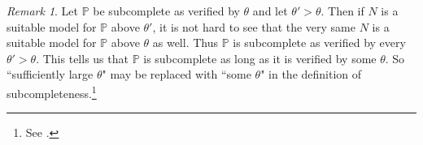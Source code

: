 \documentclass{amsart}
\theoremstyle{definition}
\newtheorem{definition}[theorem]{Definition}
\theoremstyle{remark}
\newtheorem{remark}[theorem]{Remark}
\renewcommand{\P}{\mathbb{P}}
\newcommand{\N}{{\overline{N}}}
\newcommand{\G}{\overline{G}}
\newcommand{\ZFC}{\textup{\ensuremath{\textsf{ZFC}}}}
\DeclareMathOperator{\ran}{range}
\newcommand{\SH}{\mathcal{H}\textit{ull} \,}
\newcommand{\sk}[3]{\SH^{#1}( {#2} \cup {\ran(#3)} ) }
\newcommand{\Sk}[3]{\SH^{#1}( {#2} \cup {#3} ) }
\begin{document}
%
%
%

\begin{remark}\label{remark:VerifyingSC}Let $\P$ be subcomplete as verified by $\theta$ and let $\theta'>\theta$. Then if $N$ is a suitable model for $\P$ above $\theta'$, it is not hard to see that the very same $N$ is a suitable model for $\P$ above $\theta$ as well. Thus $\P$ is subcomplete as verified by every $\theta' > \theta$. This tells us that $\P$ is subcomplete as long as it is verified by some $\theta$. So ``sufficiently large $\theta$" may be replaced with ``some $\theta$" in the definition of subcompleteness.\footnote{See \cite[Section 3.1 Lemma 2.4]{Jensen:2012fr}.} \end{remark}
\end{document}
